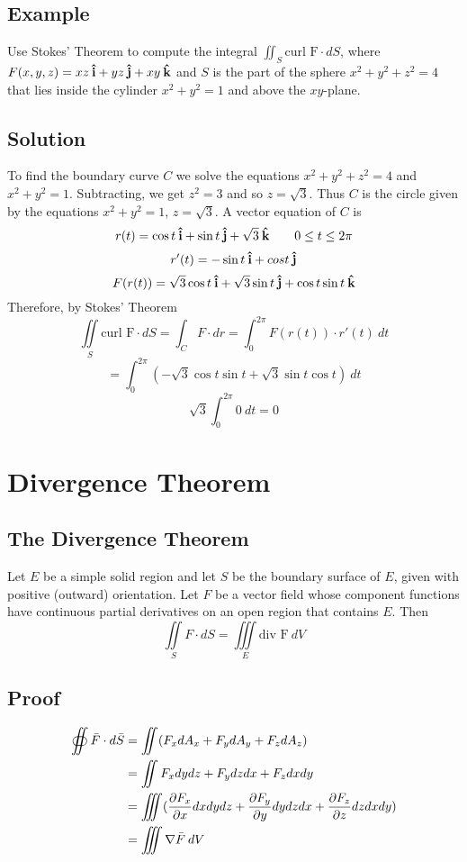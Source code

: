 \subsection*{Example}
Use Stokes’ Theorem to compute the integral $\iint_S \text{curl F}\cdot dS$, where
$F(x,y,z)=xz\:\boldsymbol{\hat{\textbf{i}}}+yz\:\boldsymbol{\hat{\textbf{j}}}+xy\:\boldsymbol{\hat{\textbf{k}}}$ and $S$ is the part of the sphere $x^2+y^2+z^2=4$
that lies inside the cylinder $x^2+y^2=1$ and above the $xy$-plane.

\subsection*{Solution}
To find the boundary curve $C$ we solve the equations $x^2+y^2+z^2=4$ and $x^2+y^2=1$.
Subtracting, we get $z^2=3$ and so $z=\sqrt{3}$. Thus $C$ is the circle given by the
equations $x^2+y^2=1$, $z=\sqrt{3}$. A vector equation of $C$ is
$$r(t)=\cos{t}\:\boldsymbol{\hat{\textbf{i}}}+\sin{t}\:\boldsymbol{\hat{\textbf{j}}}+\sqrt{3}\:\boldsymbol{\hat{\textbf{k}}} \qquad 0\leq t\leq 2\pi$$
$$r'(t)=-\sin{t}\:\boldsymbol{\hat{\textbf{i}}}+cos{t}\:\boldsymbol{\hat{\textbf{j}}}$$
$$F(r(t))=\sqrt{3}\cos{t}\:\boldsymbol{\hat{\textbf{i}}}+\sqrt{3}\sin{t}\:\boldsymbol{\hat{\textbf{j}}}+\cos{t}\sin{t}\:\boldsymbol{\hat{\textbf{k}}}$$
Therefore, by Stokes' Theorem
$$\iint\limits_S \text{curl F}\cdot dS=\int_C F\cdot dr=\int_0^{2\pi} F(r(t))\cdot r'(t)\:dt$$
$$=\int_0^{2\pi}(-\sqrt{3}\cos{t}\sin{t}+\sqrt{3}\sin{t}\cos{t})\:dt$$
$$\sqrt{3}\int_0^{2\pi}0\:dt=0$$

\section{Divergence Theorem}

\subsection*{The Divergence Theorem}
Let $E$ be a simple solid region and let $S$ be the boundary surface of $E$,
given with positive (outward) orientation. Let $F$ be a vec­tor field whose
component functions have continuous partial derivatives on an open region that
contains $E$. Then
$$\iint\limits_S F\cdot dS=\iiint\limits_E \text{div F}\:dV$$

\subsection*{Proof}
\begin{align*}
        \oiint \bar{F}\cdot d\bar{S} & =\iint(F_xdA_x+F_ydA_y+F_zdA_z)                                    \\
                                     & =\iint F_xdydz + F_ydzdx + F_zdxdy                                 \\
                                     & =\iiint (\pdv{F_x}{x}dxdydz+\pdv{F_y}{y}dydzdx+\pdv{F_z}{z}dzdxdy) \\
                                     & =\iiint \nabla \bar{F}\:dV
\end{align*}

